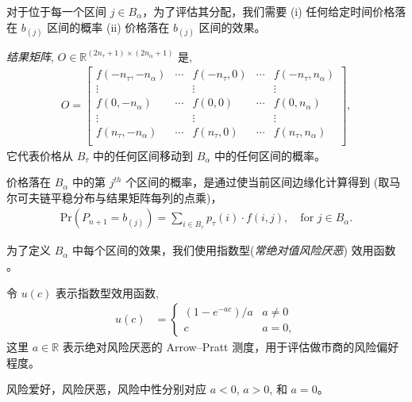 \documentclass[sigconf, dvipsnames]{acmart}
\begin{document}
对于位于每一个区间 $j \in B_{\alpha}$，为了评估其分配，我们需要
(i) 任何给定时间价格落在 $b_{(j)}$ 区间的概率 (ii) 价格落在 $b_{(j)}$ 区间的效果。
%
\begin{definition}
\textit{结果矩阵}, $O \in \mathbb{R}^{(2n_{\tau}+1)\times (2n_{\alpha}+1)}$ 是,
\begin{align}
O = 
\begin{bmatrix}
  f(-n_{\tau},-n_{\alpha}) & \cdots & f(-n_{\tau}, 0) & \cdots & f(-n_{\tau},n_{\alpha}) \\
  \vdots & & \vdots &  & \vdots \\
  f(0,-n_{\alpha}) & \cdots & f(0, 0) & \cdots & f(0,n_{\alpha}) \\
  \vdots & & \vdots &  & \vdots \\
  f(n_{\tau},-n_{\alpha}) & \cdots & f(n_{\tau}, 0) & \cdots & f(n_{\tau},n_{\alpha}) \\
\end{bmatrix},
\end{align}
它代表价格从 $B_{\tau}$ 中的任何区间移动到 $B_{\alpha}$ 中的任何区间的概率。
\end{definition}
价格落在  $B_{\alpha}$ 中的第 $j^{th}$ 个区间的概率，是通过使当前区间边缘化计算得到
(取马尔可夫链平稳分布与结果矩阵每列的点乘)，
%
\begin{align}
    \mathrm{Pr}\left(P_{n+1} = b_{(j)}\right) = \sum_{i \in B_{\tau}} p_{\tau}(i) \cdot f(i,j), \quad \text{for } j \in B_{\alpha}.
\end{align}

为了定义 $B_{\alpha}$ 中每个区间的效果，我们使用指数型(\textit{常绝对值风险厌恶}) 效用函数 \cite{arrow1965aspects, pratt1978risk,expectedutilityfunction}。
%
\begin{definition}\label{def:exponential_utility}
令 $u(c)$ 表示指数型效用函数,
\begin{align}\label{eq:exponential_utility}
    u(c) &= 
    \begin{cases}
    \left(1-e^{-ac}\right) / a & a\neq 0 \\
    c & a = 0,
    \end{cases}
\end{align}
这里 $a \in \mathbb{R}$ 表示绝对风险厌恶的 Arrow--Pratt 测度，用于评估做市商的风险偏好程度。

风险爱好，风险厌恶，风险中性分别对应 $a < 0$, $a > 0$, 和 $a = 0$。
\end{definition}
\end{document}
